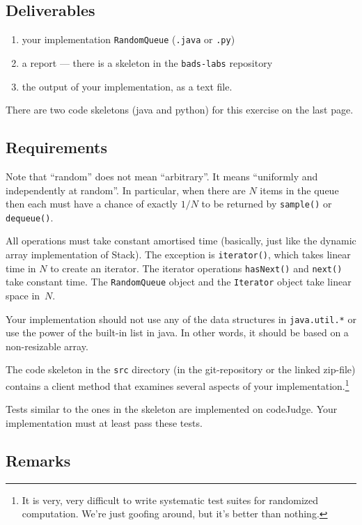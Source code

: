 \documentclass{tufte-handout}
\begin{document}
\subsection{Deliverables}

\begin{enumerate}
\item your implementation {\tt RandomQueue} ({\tt.java} or {\tt.py}) 
\item a report --- there is a skeleton in the \texttt{bads-labs} repository
\item the output of your implementation, as a text file.
\end{enumerate}
There are two code skeletons (java and python) for this exercise on the last page.


\subsection{Requirements}
Note that ``random'' does not mean ``arbitrary''.
It means ``uniformly and independently at random''.
In particular, when there are $N$ items in the queue then each must
have a chance of exactly $1/N$ to be returned by {\tt sample()} or
{\tt dequeue()}.

All operations must take constant amortised time (basically, just like
the dynamic array implementation of Stack).
The exception is {\tt iterator()}, which takes linear time in $N$ to create an iterator.
The iterator operations {\tt hasNext()} and {\tt next()} take constant
time.
The {\tt RandomQueue} object and the {\tt Iterator} object take linear
space in~$N$.

Your implementation should not use any of the data structures in \texttt{java.util.*} or use the power of the built-in list in java. In other words, it should be based on a non-resizable array. 

The code skeleton in the {\tt src} directory (in the git-repository or the linked zip-file) contains a client method
that examines several aspects of your implementation.\footnote{It is very, very difficult to write systematic test suites for
randomized computation. We're just goofing around, but it's better
than nothing.}

Tests similar to the ones in the skeleton are implemented on codeJudge. 
Your implementation must at least pass these tests.

\subsection{Remarks}
\end{document}
